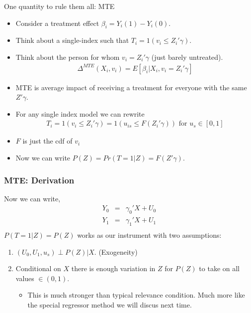 \documentclass[xcolor=pdftex,dvipsnames,table,mathserif]{beamer}
\begin{document}
\begin{frame}{One quantity to rule them all: MTE}
\begin{itemize}
\item Consider a treatment effect $\beta_i = Y_{i}(1) - Y_{i}(0)$.
\item Think about a single-index such that $T_i = 1(v_i \leq Z_i' \gamma)$.
\item Think about the person for whom $v_i = Z_i'\gamma$ (just barely untreated).
\begin{eqnarray*}
\Delta^{MTE}(X_i, v_i) = E[\beta_i | X_i, v_i = Z_i'\gamma] 
\end{eqnarray*}
\item MTE is average impact of receiving a treatment for everyone with the same $Z' \gamma$.
\item For any single index model we can rewrite 
\begin{eqnarray*}
T_i = 1(v_i \leq Z_i' \gamma) = 1(u_{is} \leq F(Z_i' \gamma)) \mbox{ for }  u_s \in [0,1]
\end{eqnarray*}
\item $F$ is just the cdf of $v_i$
\item Now we can write $P(Z) = Pr(T=1|Z )= F(Z'\gamma)$.
\end{itemize}
\end{frame}

\begin{frame}
\frametitle{MTE: Derivation}
Now we can write,
\begin{eqnarray*}
Y_0 &=& \gamma_0' X + U_0\\
Y_1 &=& \gamma_1' X + U_1\\
\end{eqnarray*}
$P(T=1 | Z) = P(Z)$ works as our instrument with two assumptions:
\begin{enumerate}
\item $(U_0, U_1, u_s) \perp P(Z) | X$. (Exogeneity)
\item Conditional on $X$ there is enough variation in $Z$ for $P(Z)$ to take on all values $\in(0,1)$.
\begin{itemize}
\item This is much stronger than typical \alert{relevance} condition. Much more like the \alert{special regressor} method we will discus next time.
\end{itemize}
\end{enumerate}
\end{frame}
\end{document}
